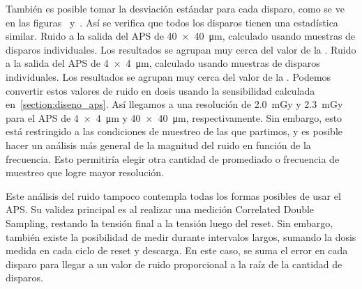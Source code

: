 También es posible tomar la desviación estándar para cada disparo,
como se ve en las figuras~ y~.
Así se verifica que todos los disparos tienen una estadística similar.
{Ruido a la salida del APS de \SI{40x40}{\micro\meter},
calculado usando muestras de disparos individuales.
Los resultados se agrupan muy cerca del valor de la .}
{Ruido a la salida del APS de \SI{4x4}{\micro\meter},
calculado usando muestras de disparos individuales.
Los resultados se agrupan muy cerca del valor de la .}
Podemos convertir estos valores de ruido en dosis usando la sensibilidad
calculada en~\ref{section:diseno_aps}.
Así llegamos a una resolución de \SI{2.0}{\milli\gray} y \SI{2.3}{\milli\gray}
para el APS de \SI{4x4}{\micro\meter} y \SI{40x40}{\micro\meter},
    respectivamente.
Sin embargo, esto está restringido a 
las condiciones de muestreo de las que partimos,
y es posible hacer un análisis más general de 
la magnitud del ruido en función de la frecuencia.
Esto permitiría elegir otra cantidad de promediado o frecuencia de muestreo 
que logre mayor resolución.

Este análisis del ruido tampoco contempla todas los formas posibles
de usar el APS.
Su validez principal es al realizar una medición Correlated Double Sampling,
restando la tensión final a la tensión luego del reset.
Sin embargo,
también existe la posibilidad de medir durante intervalos largos,
sumando la dosis medida en cada ciclo de reset y descarga.
En este caso, se suma el error en cada disparo para llegar a un valor de ruido
proporcional a la raíz de la cantidad de disparos.

